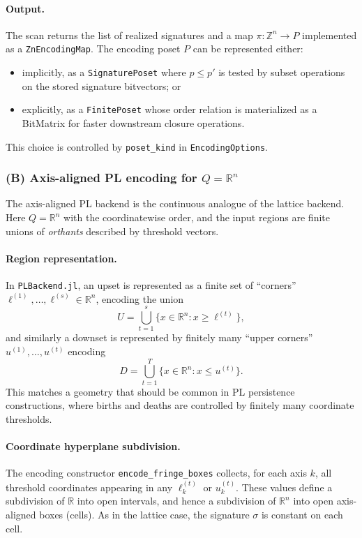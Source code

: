 \documentclass{article}
\newcommand{\<}{\langle}
\renewcommand{\>}{\rangle}
\theoremstyle{definition}
\theoremstyle{remark}
\begin{document}
	\paragraph{Output.}
	The scan returns the list of realized signatures and a map
	$\pi\colon \mathbb{Z}^n\to P$ implemented as a \texttt{ZnEncodingMap}.  The encoding
	poset $P$ can be represented either:
	\begin{itemize}
		\item implicitly, as a \texttt{SignaturePoset} where $p\le p'$ is tested by subset
		operations on the stored signature bitvectors; or
		\item explicitly, as a \texttt{FinitePoset} whose order relation is materialized as a
		BitMatrix for faster downstream closure operations.
	\end{itemize}
	This choice is controlled by \texttt{poset\_kind} in \texttt{EncodingOptions}.
	
	\subsubsection*{(B) Axis-aligned PL encoding for $Q=\mathbb{R}^n$}
	\label{subsubsec:encoding-PL-boxes}
	
	The axis-aligned PL backend is the continuous analogue of the lattice backend.
	Here $Q=\mathbb{R}^n$ with the coordinatewise order, and the input regions are
	finite unions of \emph{orthants} described by threshold vectors.
	
	\paragraph{Region representation.}
	In \texttt{PLBackend.jl}, an upset is represented as a finite set of ``corners''
	$\ell^{(1)},\dots,\ell^{(s)}\in \mathbb{R}^n$, encoding the union
	\[
	U=\bigcup_{t=1}^s \{x\in \mathbb{R}^n : x\ge \ell^{(t)}\},
	\]
	and similarly a downset is represented by finitely many ``upper corners''
	$u^{(1)},\dots,u^{(t)}$ encoding
	\[
	D=\bigcup_{t=1}^T \{x\in \mathbb{R}^n : x\le u^{(t)}\}.
	\]
	This matches a geometry that should be common in PL persistence constructions, where births and deaths
	are controlled by finitely many coordinate thresholds.
	
	\paragraph{Coordinate hyperplane subdivision.}
	The encoding constructor \texttt{encode\_fringe\_boxes} collects, for each axis
	$k$, all threshold coordinates appearing in any $\ell^{(t)}_k$ or $u^{(t)}_k$.
	These values define a subdivision of $\mathbb{R}$ into open intervals, and hence
	a subdivision of $\mathbb{R}^n$ into open axis-aligned boxes (cells).  As in the
	lattice case, the signature $\sigma$ is constant on each cell.
	
\end{document}
